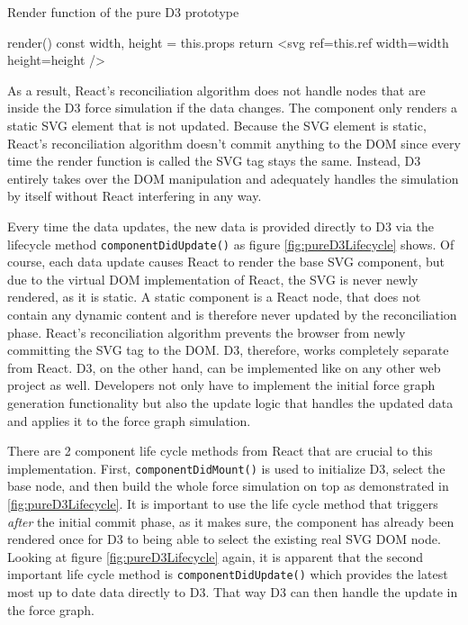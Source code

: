 \begin{program}
\caption{Render function of the pure D3 prototype}
\label{prog:pureD3render}
\begin{JsCode}
render() {
  const { width, height } = this.props
  return <svg ref={this.ref} width={width} height={height} />
}
\end{JsCode}
\end{program}

As a result, React's reconciliation algorithm does not handle nodes that are inside the D3 force simulation if the data changes. The component only renders a static SVG element that is not updated. Because the SVG element is static, React's reconciliation algorithm doesn't commit anything to the DOM since every time the render function is called the SVG tag stays the same. Instead, D3 entirely takes over the DOM manipulation and adequately handles the simulation by itself without React interfering in any way.

Every time the data updates, the new data is provided directly to D3 via the lifecycle method \texttt{componentDidUpdate()} as figure \ref{fig:pureD3Lifecycle} shows. Of course, each data update causes React to render the base SVG component, but due to the virtual DOM implementation of React, the SVG is never newly rendered, as it is static. A static component is a React node, that does not contain any dynamic content and is therefore never updated by the reconciliation phase. React's reconciliation algorithm prevents the browser from newly committing the SVG tag to the DOM. D3, therefore, works completely separate from React. D3, on the other hand, can be implemented like on any other web project as well. Developers not only have to implement the initial force graph generation functionality but also the update logic that handles the updated data and applies it to the force graph simulation.

There are 2 component life cycle methods from React that are crucial to this implementation. First, \texttt{componentDidMount()} is used to initialize D3, select the base node, and then build the whole force simulation on top as demonstrated in \ref{fig:pureD3Lifecycle}. It is important to use the life cycle method that triggers \emph{after} the initial commit phase, as it makes sure, the component has already been rendered once for D3 to being able to select the existing real SVG DOM node. Looking at figure \ref{fig:pureD3Lifecycle} again, it is apparent that the second important life cycle method is \texttt{componentDidUpdate()} which provides the latest most up to date data directly to D3. That way D3 can then handle the update in the force graph.

